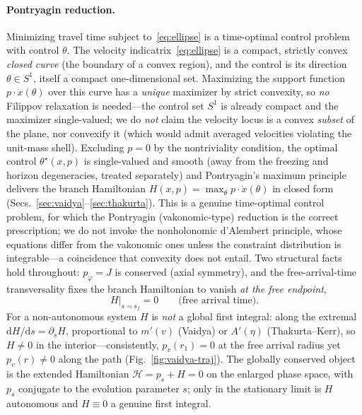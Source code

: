 \documentclass[12pt]{iopart}
\newcommand{\dd}{\mathrm{d}}
\begin{document}
\paragraph{Pontryagin reduction.} Minimizing travel time subject
to~\eqref{eq:ellipse} is a time-optimal control problem with control $\theta$.
The velocity indicatrix~\eqref{eq:ellipse} is a compact, strictly convex
\emph{closed curve} (the boundary of a convex region), and the control is its
direction $\theta\in S^1$, itself a compact one-dimensional set. Maximizing the
support function $p\cdot\dot x(\theta)$ over this curve has a \emph{unique} maximizer
by strict convexity, so \emph{no} Filippov relaxation is needed---the control set
$S^1$ is already compact and the maximizer single-valued; we do \emph{not} claim the
velocity locus is a convex \emph{subset} of the plane, nor convexify it (which would
admit averaged velocities violating the unit-mass shell). Excluding $p=0$ by the
nontriviality condition, the optimal control $\theta^\star(x,p)$ is single-valued and
smooth (away from the freezing and horizon degeneracies, treated separately) and
Pontryagin's
maximum principle \cite{Pontryagin,Liberzon} delivers the branch Hamiltonian
$H(x,p)=\max_\theta p\cdot\dot x(\theta)$ in closed form
(Secs.~\ref{sec:vaidya}--\ref{sec:thakurta}). This is a genuine time-optimal
control problem, for which the Pontryagin (vakonomic-type) reduction is the correct
prescription; we do not invoke the nonholonomic d'Alembert principle, whose
equations differ from the vakonomic ones unless the constraint distribution is
integrable---a coincidence that convexity does not entail. Two structural facts hold throughout: $p_\varphi=J$ is conserved (axial symmetry),
and the free-arrival-time transversality fixes the branch Hamiltonian to vanish
\emph{at the free endpoint},
\begin{equation}
    H\big|_{s=s_f}=0 \qquad\text{(free arrival time).}
    \label{eq:transversality}
\end{equation}
For a non-autonomous system $H$ is \emph{not} a global first integral: along the
extremal $\dd H/\dd s=\partial_s H$, proportional to $m'(v)$ (Vaidya) or $A'(\eta)$
(Thakurta--Kerr), so $H\neq0$ in the interior---consistently, $p_v(r_1)=0$ at the
free arrival radius yet $p_v(r)\neq0$ along the path (Fig.~\ref{fig:vaidya-traj}).
The globally conserved object is the extended Hamiltonian $\mathcal H=p_s+H=0$ on
the enlarged phase space, with $p_s$ conjugate to the evolution parameter $s$; only
in the stationary limit is $H$ autonomous and $H\equiv0$ a genuine first integral.
\end{document}
